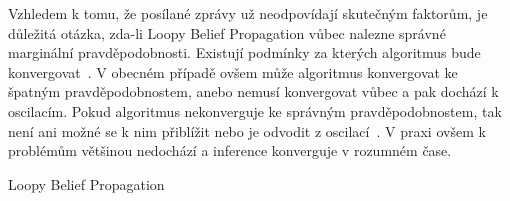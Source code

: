 Vzhledem k tomu, že posílané zprávy už neodpovídají skutečným faktorům, je důležitá otázka, zda-li Loopy Belief Propagation vůbec nalezne správné marginální pravděpodobnosti.
Existují podmínky za kterých algoritmus bude konvergovat~\cite{tatikonda2002loopy}.
V obecném případě ovšem může algoritmus konvergovat ke špatným pravděpodobnostem, anebo nemusí konvergovat vůbec a pak dochází k oscilacím.
Pokud algoritmus nekonverguje ke správným pravděpodobnostem, tak není ani možné se k nim přiblížit nebo je odvodit z oscilací~\cite{murphy1999loopy}.
V praxi ovšem k problémům většinou nedochází a inference konverguje v rozumném čase.

\begin{algorithm}
\caption{Loopy Belief Propagation}
\label{alg:lbp}
\begin{algorithmic}
\State

\Repeat
            \Else
            \EndIf
        \EndFor
    \EndFor
{}

\EndFor
\EndFunction

\State

\State

    \EndFor
\EndFor
\EndFunction

\State

\State

\EndFunction

\State

\State

\EndFunction
\end{algorithmic}
\end{algorithm}

